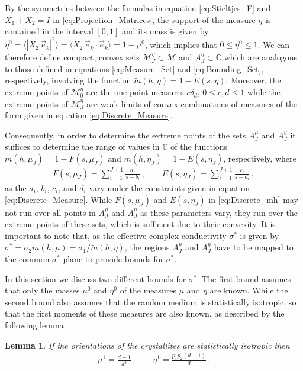 \documentclass[11pt]{amsart}
\newtheorem{lem}[thm]{Lemma}
\begin{document}
By the symmetries between the formulas in equation
\eqref{eq:Stieltjes_F} and $X_1+X_2=I$ in
\eqref{eq:Projection_Matrices}, the support of the measure $\eta$ 
is contained in the interval $[0,1]$ and its mass is given by
$\eta^0=\langle|X_2\,\vec{e}_k|^2\rangle=\langle X_2\,\vec{e}_k\cdot\vec{e}_k\rangle=1-\mu^0$, which
implies that
$0\leq\eta^0\leq1$. We can therefore define compact, convex sets
$\mathscr{M}_J^\eta\subset\mathscr{M}$ and $A_J^\eta\subset\mathbb{C}$ which are
analogous to those defined in equations \eqref{eq:Measure_Set} and
\eqref{eq:Bounding_Set}, respectively, involving the function
$\tilde{m}(h,\eta)=1-E(s,\eta)$. Moreover, the extreme points of
$\mathscr{M}_0^\eta$ are the one point measures $c\delta_d$, $0\leq c,d\leq1$ 
while the extreme points of $\mathscr{M}_J^\eta$ are weak limits
of convex combinations of measures of the form given in equation
\eqref{eq:Discrete_Measure}. 



Consequently, in order to determine the extreme
points of the sets $A_J^\mu$ and $A_J^\eta$ it suffices to determine the
range of values in $\mathbb{C}$ of the functions $m(h,\mu_J)=1-F(s,\mu_J)$
and $\tilde{m}(h,\eta_J)=1-E(s,\eta_J)$, respectively, where  
%
\begin{align}\label{eq:Discrete_mh}
  F(s,\mu_J)=\sum_{i=1}^{J+1}\frac{a_i}{s-b_i}\,, \qquad
  E(s,\eta_J)=\sum_{i=1}^{J+1}\frac{c_i}{s-d_i}\,,
\end{align}
as the $a_i$, $b_i$, $c_i$, and $d_i$ vary under the
constraints given in equation  \eqref{eq:Discrete_Measure}. While
$F(s,\mu_J)$ and $E(s,\eta_J)$ in 
\eqref{eq:Discrete_mh} may not run over all points in $A_J^\mu$ and
$A_J^\eta$ as these parameters vary, they run over the
extreme points of these sets, which is sufficient due to their
convexity. It is important to note that, as the effective complex
conductivity $\sigma^*$ is given by $\sigma^*=\sigma_2m(h,\mu)=\sigma_1/\tilde{m}(h,\eta)$, the
regions $A_J^\mu$ and $A_J^\eta$ have to be mapped to the common
$\sigma^*$-plane to provide bounds for $\sigma^*$.    





In this section we discuss two different bounds for $\sigma^*$. The first
bound assumes that only the masses $\mu^0$ and $\eta^0$ of the measures $\mu$
and $\eta$ are known. While the second bound also assumes that the random
medium is statistically isotropic, so that the first moments of these
measures are also known, as described by the following lemma.
%
\begin{lem}\label{lem:first_moment}
%
If the orientations of the crystallites are statistically isotropic
then
%
\begin{align}\label{eq:First_Moments}
  \mu^1=\frac{d-1}{d^3}\,, \qquad
  \eta^1=\frac{p_1p_2(d-1)}{d}\,.
\end{align}
%
\end{lem}
%
\end{document}
